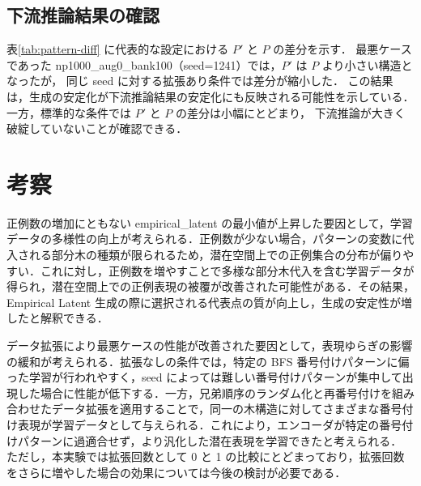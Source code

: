 \documentclass[submit,techrep,noauthor]{ipsj}
\begin{document}
\subsection{下流推論結果の確認}

表\ref{tab:pattern-diff} に代表的な設定における $P'$ と $P$ の差分を示す．
最悪ケースであった np1000\_aug0\_bank100（seed=1241）では，$P'$ は $P$ より小さい構造となったが，
同じ seed に対する拡張あり条件では差分が縮小した．
この結果は，生成の安定化が下流推論結果の安定化にも反映される可能性を示している．
一方，標準的な条件では $P'$ と $P$ の差分は小幅にとどまり，
下流推論が大きく破綻していないことが確認できる．

\section{考察}


正例数の増加にともない empirical\_latent の最小値が上昇した要因として，学習データの多様性の向上が考えられる．正例数が少ない場合，パターンの変数に代入される部分木の種類が限られるため，潜在空間上での正例集合の分布が偏りやすい．これに対し，正例数を増やすことで多様な部分木代入を含む学習データが得られ，潜在空間上での正例表現の被覆が改善された可能性がある．その結果，Empirical Latent 生成の際に選択される代表点の質が向上し，生成の安定性が増したと解釈できる．


データ拡張により最悪ケースの性能が改善された要因として，表現ゆらぎの影響の緩和が考えられる．拡張なしの条件では，特定の BFS 番号付けパターンに偏った学習が行われやすく，seed によっては難しい番号付けパターンが集中して出現した場合に性能が低下する．一方，兄弟順序のランダム化と再番号付けを組み合わせたデータ拡張を適用することで，同一の木構造に対してさまざまな番号付け表現が学習データとして与えられる．これにより，エンコーダが特定の番号付けパターンに過適合せず，より汎化した潜在表現を学習できたと考えられる．
ただし，本実験では拡張回数として 0 と 1 の比較にとどまっており，拡張回数をさらに増やした場合の効果については今後の検討が必要である．

\end{document}
